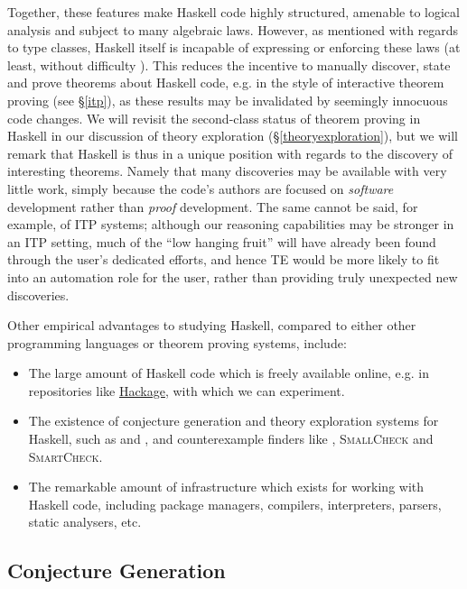 Together, these features make Haskell code highly structured, amenable to logical analysis and subject to many algebraic laws. However, as mentioned with regards to type classes, Haskell itself is incapable of expressing or enforcing these laws (at least, without difficulty \citep{lindley2014hasochism}). This reduces the incentive to manually discover, state and prove theorems about Haskell code, e.g. in the style of interactive theorem proving (see \S \ref{itp}), as these results may be invalidated by seemingly innocuous code changes. We will revisit the second-class status of theorem proving in Haskell in our discussion of theory exploration (\S \ref{theoryexploration}), but we will remark that Haskell is thus in a unique position with regards to the discovery of interesting theorems. Namely that many discoveries may be available with very little work, simply because the code's authors are focused on \emph{software} development rather than \emph{proof} development. The same cannot be said, for example, of ITP systems; although our reasoning capabilities may be stronger in an ITP setting, much of the ``low hanging fruit'' will have already been found through the user's dedicated efforts, and hence TE would be more likely to fit into an automation role for the user, rather than providing truly unexpected new discoveries.

Other empirical advantages to studying Haskell, compared to either other programming languages or theorem proving systems, include:

\begin{itemize}

\item The large amount of Haskell code which is freely available online, e.g. in repositories like \href{http://hackage.haskell.org}{Hackage}, with which we can experiment.

\item The existence of conjecture generation and theory exploration systems for Haskell, such as \qspec{} and \hspec{}, and counterexample finders like \qcheck{}, \textsc{SmallCheck} and \textsc{SmartCheck}.

\item The remarkable amount of infrastructure which exists for working with Haskell code, including package managers, compilers, interpreters, parsers, static analysers, etc.

\end{itemize}

\iffalse

\subsection{Conjecture Generation}


